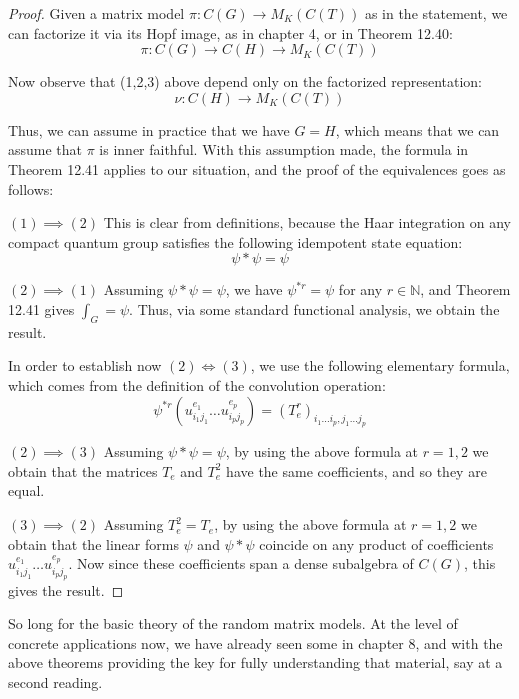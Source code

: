 \documentclass[12pt]{amsbook}
\begin{document}
\begin{proof}
Given a matrix model $\pi:C(G)\to M_K(C(T))$ as in the statement, we can factorize it via its Hopf image, as in chapter 4, or in Theorem 12.40:
$$\pi:C(G)\to C(H)\to M_K(C(T))$$

Now observe that (1,2,3) above depend only on the factorized representation:
$$\nu:C(H)\to M_K(C(T))$$

Thus, we can assume in practice that we have $G=H$, which means that we can assume that $\pi$ is inner faithful. With this assumption made, the formula in Theorem 12.41 applies to our situation, and the proof of the equivalences goes as follows:

\medskip

$(1)\implies(2)$ This is clear from definitions, because the Haar integration on any compact quantum group satisfies the following idempotent state equation:
$$\psi*\psi=\psi$$

$(2)\implies(1)$ Assuming $\psi*\psi=\psi$, we have $\psi^{*r}=\psi$ for any $r\in\mathbb N$, and Theorem 12.41 gives $\int_G=\psi$. Thus, via some standard functional analysis, we obtain the result.

\medskip

In order to establish now $(2)\Longleftrightarrow(3)$, we use the following elementary formula, which comes from the definition of the convolution operation:
$$\psi^{*r}(u_{i_1j_1}^{e_1}\ldots u_{i_pj_p}^{e_p})=(T_e^r)_{i_1\ldots i_p,j_1\ldots j_p}$$

\medskip

$(2)\implies(3)$ Assuming $\psi*\psi=\psi$, by using the above formula at $r=1,2$ we obtain that the matrices $T_e$ and $T_e^2$ have the same coefficients, and so they are equal.

\medskip

$(3)\implies(2)$ Assuming $T_e^2=T_e$, by using the above formula at $r=1,2$ we obtain that the linear forms $\psi$ and $\psi*\psi$ coincide on any product of coefficients $u_{i_1j_1}^{e_1}\ldots u_{i_pj_p}^{e_p}$. Now since these coefficients span a dense subalgebra of $C(G)$, this gives the result.
\end{proof}

So long for the basic theory of the random matrix models. At the level of concrete applications now, we have already seen some in chapter 8, and with the above theorems providing the key for fully understanding that material, say at a second reading. 

\bigskip
\end{document}
